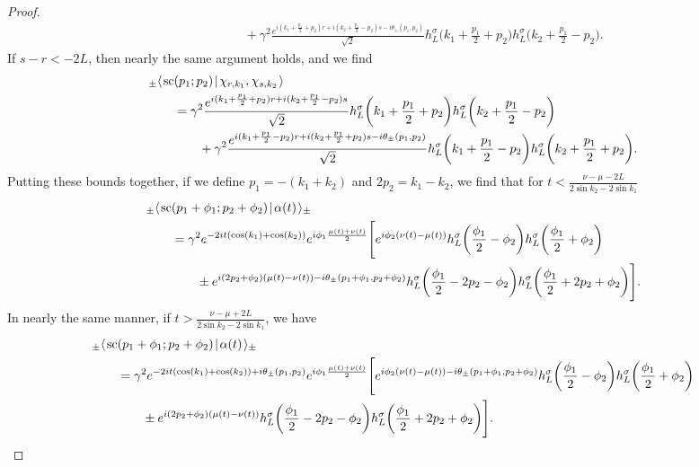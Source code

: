 \documentclass[../thesis-main/thesis-main]{subfiles}
\begin{document}
\begin{proof}
\begin{align}
   &\qquad \qquad +\gamma^2 \frac{e^{i (k_1 + \frac{p_1}{2} + p_2) r + i (k_2 + \frac{p_1}{2} - p_2)s - i\theta_{\pm}(p_1,p_2)}}{\sqrt{2}} h_L^\sigma\bigg( k_1 + \frac{p_1}{2} + p_2\bigg) h_{L}^\sigma \bigg(k_2 + \frac{p_1}{2} - p_2\bigg).
\end{align}
If $s - r < -2L$, then nearly the same argument holds, and we find
\begin{align}
   &_{\pm}\langle\mspace{2mu} \text{sc}(p_1;p_2) \mspace{2mu} | \mspace{2mu} \chi_{r,k_1},\chi_{s,k_2}\mspace{2mu} \rangle\nonumber\\
   &\qquad = \gamma^2 \frac{e^{i (k_1 + \frac{p_1}{2} + p_2) r + i (k_2 + \frac{p_1}{2} - p_2)s}}{\sqrt{2}} h_L^\sigma\bigg( k_1 + \frac{p_1}{2} + p_2\bigg) h_{L}^\sigma \bigg(k_2 + \frac{p_1}{2} - p_2\bigg)\nonumber\\
   &\qquad \qquad +\gamma^2\frac{e^{i (k_1 + \frac{p_1}{2} - p_2) r + i (k_2 + \frac{p_1}{2} + p_2)s - i\theta_{\pm}(p_1,p_2)}}{\sqrt{2}} h_L^\sigma\bigg( k_1 + \frac{p_1}{2} - p_2\bigg) h_{L}^\sigma \bigg(k_2 + \frac{p_1}{2} + p_2\bigg).
\end{align}
Putting these bounds together, if we define $p_1 = -(k_1 + k_2)$ and $2 p_2 = k_1 - k_2$, we find that for $t < \frac{\nu - \mu - 2L}{2 \sin k_2 - 2 \sin k_1}$
\begin{align}
  &{}_{\pm}\langle\mspace{2mu} \text{sc}(p_1 + \phi_1 ; p_2 + \phi_2) \mspace{2mu} | \mspace{2mu} \alpha(t)\mspace{2mu} \rangle_{\pm} \nonumber\\
  &\qquad    = \gamma^2e^{-2 i  t (\cos(k_1) + \cos(k_2))} e^{i \phi_1\frac{\mu(t) + \nu(t)}{2}} \Bigg[e^{i \phi_2 (\nu(t) - \mu(t)) } h_{L}^\sigma \bigg(\frac{\phi_1}{2} - \phi_2\bigg) h_L^\sigma\bigg( \frac{\phi_1}{2} + \phi_2\bigg)\nonumber\\
  &\qquad\qquad \pm e^{ i (2 p_2+\phi_2)(\mu(t) - \nu(t)) - i \theta_{\pm}(p_1 + \phi_1, p_2+\phi_2)}h_L^\sigma\bigg(\frac{\phi_1}{2} - 2p_2 - \phi_2 \bigg) h_L^\sigma\bigg(\frac{\phi_1}{2} + 2 p_2 + \phi_2\bigg)\Bigg].
\end{align}
In nearly the same manner, if $ t > \frac{\nu - \mu + 2 L}{2 \sin k_2 - 2 \sin k_1}$, we have
\begin{align}
  &{}_{\pm}\langle\mspace{2mu} \text{sc}(p_1 + \phi_1 ; p_2 + \phi_2) \mspace{2mu} | \mspace{2mu} \alpha(t)\mspace{2mu} \rangle_{\pm} \nonumber\\
  &\qquad    = \gamma^2e^{-2 i  t (\cos(k_1) + \cos(k_2)) + i \theta_{\pm}(p_1,p_2)} e^{i\phi_1\frac{\mu(t) + \nu(t)}{2}} \Bigg[e^{i \phi_2 (\nu(t) - \mu(t)) - i \theta_{\pm}(p_1 + \phi_1, p_2+\phi_2) } h_{L}^\sigma \bigg(\frac{\phi_1}{2} - \phi_2\bigg) h_L^\sigma\bigg( \frac{\phi_1}{2} + \phi_2\bigg)\nonumber\\
  &\qquad\qquad \pm e^{ i (2 p_2+\phi_2)(\mu(t) - \nu(t)) }h_L^\sigma\bigg(\frac{\phi_1}{2} - 2p_2 - \phi_2 \bigg) h_L^\sigma\bigg(\frac{\phi_1}{2} + 2 p_2 + \phi_2\bigg)\Bigg].
\end{align}


\end{proof}
\end{document}
